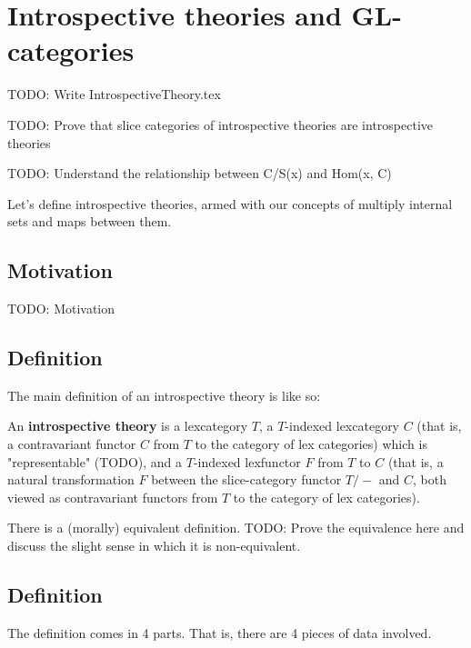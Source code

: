 \section{Introspective theories and GL-categories}

TODO: Write IntrospectiveTheory.tex

TODO: Prove that slice categories of introspective theories are introspective theories

TODO: Understand the relationship between C/S(x) and Hom(x, C)

Let's define introspective theories, armed with our concepts of multiply internal sets and maps between them.

\subsection{Motivation}
TODO: Motivation

\subsection{Definition}
The main definition of an introspective theory is like so:
\begin{definition}
An \textbf{introspective theory} is a lexcategory $T$, a $T$-indexed lexcategory $C$ (that is, a contravariant functor $C$ from $T$ to the category of lex categories) which is "representable" (TODO), and a $T$-indexed lexfunctor $F$ from $T$ to $C$ (that is, a natural transformation $F$ between the slice-category functor $T/-$ and $C$, both viewed as contravariant functors from $T$ to the category of lex categories).
\end{definition}

There is a (morally) equivalent definition. TODO: Prove the equivalence here and discuss the slight sense in which it is non-equivalent.
\subsection{Definition}
The definition comes in 4 parts. That is, there are 4 pieces of data involved.

